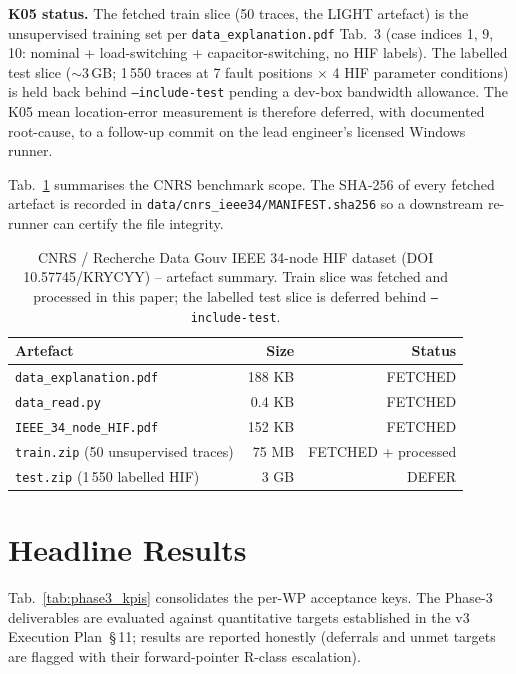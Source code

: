 \documentclass[conference]{IEEEtran}
\begin{document}
\textbf{K05 status.}  The fetched train slice (50 traces, the LIGHT
artefact) is the unsupervised training set per
\texttt{data\_explanation.pdf} Tab.~3 (case indices 1, 9, 10:
nominal + load-switching + capacitor-switching, no HIF labels).
The labelled test slice ($\sim 3$\,GB; 1\,550 traces at 7 fault
positions $\times$ 4 HIF parameter conditions) is held back behind
\texttt{--include-test} pending a dev-box bandwidth allowance.
The K05 mean location-error measurement is therefore deferred,
with documented root-cause, to a follow-up commit on the lead
engineer's licensed Windows runner.

Tab.~\ref{tab:cnrs} summarises the CNRS benchmark scope.  The
SHA-256 of every fetched artefact is recorded in
\texttt{data/cnrs\_ieee34/MANIFEST.sha256} so a downstream
re-runner can certify the file integrity.

\begin{table}[!t]
\caption{CNRS / Recherche Data Gouv IEEE 34-node HIF dataset
(DOI 10.57745/KRYCYY) -- artefact summary.  Train slice was
fetched and processed in this paper; the labelled test slice is
deferred behind \texttt{--include-test}.}
\label{tab:cnrs}
\centering
\renewcommand{\arraystretch}{1.18}
\begin{tabular}{@{}lrr@{}}
\toprule
\textbf{Artefact} & \textbf{Size} & \textbf{Status}\\
\midrule
\texttt{data\_explanation.pdf}     & 188 KB & FETCHED\\
\texttt{data\_read.py}             & 0.4 KB & FETCHED\\
\texttt{IEEE\_34\_node\_HIF.pdf}   & 152 KB & FETCHED\\
\texttt{train.zip} (50 unsupervised traces) & 75 MB & FETCHED + processed\\
\texttt{test.zip} (1\,550 labelled HIF) & 3 GB & DEFER\\
\bottomrule
\end{tabular}
\end{table}

\section{Headline Results}\label{sec:results}
Tab.~\ref{tab:phase3_kpis} consolidates the per-WP acceptance keys.
The Phase-3 deliverables are evaluated against quantitative targets
established in the v3 Execution Plan~\S\,11; results are reported
honestly (deferrals and unmet targets are flagged with their
forward-pointer R-class escalation).
\end{document}
